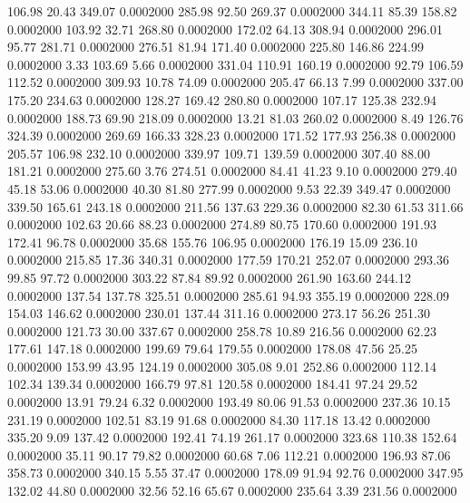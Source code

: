  106.98   20.43  349.07   0.0002000
 285.98   92.50  269.37   0.0002000
 344.11   85.39  158.82   0.0002000
 103.92   32.71  268.80   0.0002000
 172.02   64.13  308.94   0.0002000
 296.01   95.77  281.71   0.0002000
 276.51   81.94  171.40   0.0002000
 225.80  146.86  224.99   0.0002000
   3.33  103.69    5.66   0.0002000
 331.04  110.91  160.19   0.0002000
  92.79  106.59  112.52   0.0002000
 309.93   10.78   74.09   0.0002000
 205.47   66.13    7.99   0.0002000
 337.00  175.20  234.63   0.0002000
 128.27  169.42  280.80   0.0002000
 107.17  125.38  232.94   0.0002000
 188.73   69.90  218.09   0.0002000
  13.21   81.03  260.02   0.0002000
   8.49  126.76  324.39   0.0002000
 269.69  166.33  328.23   0.0002000
 171.52  177.93  256.38   0.0002000
 205.57  106.98  232.10   0.0002000
 339.97  109.71  139.59   0.0002000
 307.40   88.00  181.21   0.0002000
 275.60    3.76  274.51   0.0002000
  84.41   41.23    9.10   0.0002000
 279.40   45.18   53.06   0.0002000
  40.30   81.80  277.99   0.0002000
   9.53   22.39  349.47   0.0002000
 339.50  165.61  243.18   0.0002000
 211.56  137.63  229.36   0.0002000
  82.30   61.53  311.66   0.0002000
 102.63   20.66   88.23   0.0002000
 274.89   80.75  170.60   0.0002000
 191.93  172.41   96.78   0.0002000
  35.68  155.76  106.95   0.0002000
 176.19   15.09  236.10   0.0002000
 215.85   17.36  340.31   0.0002000
 177.59  170.21  252.07   0.0002000
 293.36   99.85   97.72   0.0002000
 303.22   87.84   89.92   0.0002000
 261.90  163.60  244.12   0.0002000
 137.54  137.78  325.51   0.0002000
 285.61   94.93  355.19   0.0002000
 228.09  154.03  146.62   0.0002000
 230.01  137.44  311.16   0.0002000
 273.17   56.26  251.30   0.0002000
 121.73   30.00  337.67   0.0002000
 258.78   10.89  216.56   0.0002000
  62.23  177.61  147.18   0.0002000
 199.69   79.64  179.55   0.0002000
 178.08   47.56   25.25   0.0002000
 153.99   43.95  124.19   0.0002000
 305.08    9.01  252.86   0.0002000
 112.14  102.34  139.34   0.0002000
 166.79   97.81  120.58   0.0002000
 184.41   97.24   29.52   0.0002000
  13.91   79.24    6.32   0.0002000
 193.49   80.06   91.53   0.0002000
 237.36   10.15  231.19   0.0002000
 102.51   83.19   91.68   0.0002000
  84.30  117.18   13.42   0.0002000
 335.20    9.09  137.42   0.0002000
 192.41   74.19  261.17   0.0002000
 323.68  110.38  152.64   0.0002000
  35.11   90.17   79.82   0.0002000
  60.68    7.06  112.21   0.0002000
 196.93   87.06  358.73   0.0002000
 340.15    5.55   37.47   0.0002000
 178.09   91.94   92.76   0.0002000
 347.95  132.02   44.80   0.0002000
  32.56   52.16   65.67   0.0002000
 235.64    3.39  231.56   0.0002000
